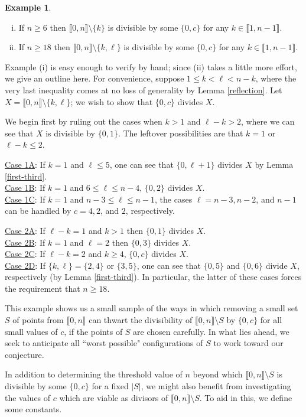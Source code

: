 \documentclass{report}
\newcommand{\llb}{\llbracket}
\newcommand{\rrb}{\rrbracket}
\renewcommand{\:}{\text{:}}
\theoremstyle{definition}
\newtheorem{eg}[defn]{Example}
\begin{document}
\begin{eg}
\begin{enumerate}[(i)]
\item If $n\ge 6$ then $\llb 0, n \rrb \setminus \{ k \}$ is divisible by some $\{0,c\}$ for any $k \in \llb 1,n-1 \rrb$.
\item If $n\ge 18$ then $\llb 0,n \rrb \setminus \{ k , \ell \}$ is divisible by some $\{0,c\}$ for any $k\in \llb 1, n-1 \rrb$.
\end{enumerate}
Example (i) is easy enough to verify by hand; since (ii) takes a little more effort, we give an outline here.
For convenience, suppose $1 \le k < \ell < n - k$, where the very last inequality comes at no loss of generality by Lemma \ref{reflection}.
Let $X = \llb 0,n \rrb \setminus \{k,\ell\}$; we wish to show that $\{0,c\}$ divides $X$.

We begin first by ruling out the cases when $k>1$ and $\ell-k > 2$, where we can see that $X$ is divisible by $\{0,1\}$.
The leftover possibilities are that $k=1$ or $\ell - k \le 2$.

\noindent\underline{Case 1A}: If $k = 1$ and $\ell \le 5$, one can see that $\{0,\ell+1\}$ divides $X$ by Lemma \ref{first-third}. \\
\underline{Case 1B}: If $k = 1$ and $6 \le \ell \le n-4$, $\{0,2\}$ divides $X$. \\
\underline{Case 1C}: If $k = 1$ and $n-3 \le \ell \le n-1$, the cases $\ell = n-3, n-2$, and $n-1$ can be handled by $c = 4,2$, and $2$, respectively.

\noindent\underline{Case 2A}: If $\ell - k =1$ and $k>1$ then $\{0,1\}$ divides $X$. \\
\underline{Case 2B}: If $k=1$ and $\ell=2$ then $\{0,3\}$ divides $X$. \\
\underline{Case 2C}: If $\ell-k = 2$ and $k\ge 4$, $\{0,c\}$ divides $X$. \\ 
\underline{Case 2D}: If $\{k,\ell\} =\{2,4\}$ or $\{3,5\}$, one can see that $\{0,5\}$ and $\{0,6\}$ divide $X$, respectively (by Lemma \ref{first-third}).
In particular, the latter of these cases forces the requirement that $n\ge 18$.
\end{eg}
This example shows us a small sample of the ways in which removing a small set $S$ of points from $\llb 0,n \rrb$ can thwart the divisibility of $\llb 0,n \rrb\setminus S$ by $\{0,c\}$ for all small values of $c$, if the points of $S$ are chosen carefully.  
In what lies ahead, we seek to anticipate all ``worst possible" configurations of $S$ to work toward our conjecture.

In addition to determining the threshold value of $n$ beyond which $\llb 0,n \rrb\setminus S$ is divisible by some $\{0,c\}$ for a fixed $|S|$, we might also benefit from investigating the values of $c$ which are viable as divisors of $\llb 0,n \rrb\setminus S$.
To aid in this, we define some constants.




\newpage
\nocite{*}


\end{document}
